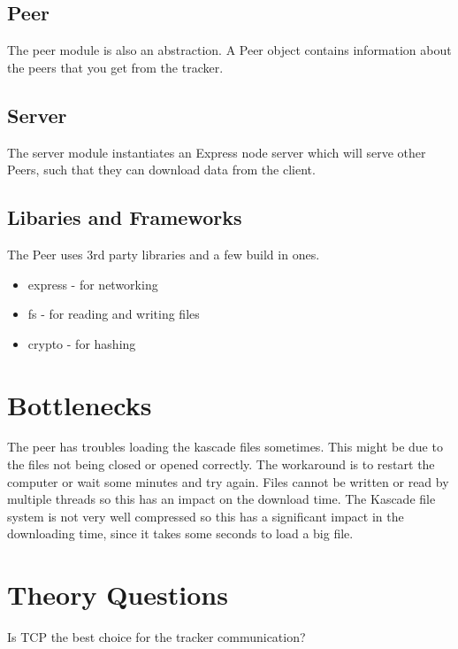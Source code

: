 \documentclass[a4paper,danish]{dnacm} %
\begin{document}
\subsection{Peer}
The peer module is also an abstraction. A Peer object contains information about the peers that you get from the tracker.

\subsection{Server}
The server module instantiates an Express node server which will serve other Peers, such that they can download data from the client.

\subsection{Libaries and Frameworks}
The Peer uses 3rd party libraries and a few build in ones.

\begin{itemize}
\item express - for networking\\
\item fs - for reading and writing files\\
\item crypto - for hashing\\
\end{itemize}


\section{Bottlenecks}

The peer has troubles loading the kascade files sometimes. This might be due to the files not being closed or opened correctly. The workaround is to restart the computer or wait some minutes and try again. Files cannot be written or read by multiple threads so this has an impact on the download time. The Kascade file system is not very well compressed so this has a significant impact in the downloading time, since it takes some seconds to load a big file. 

\section{Theory Questions}

Is TCP the best choice for the tracker communication?\\\\
\end{document}
